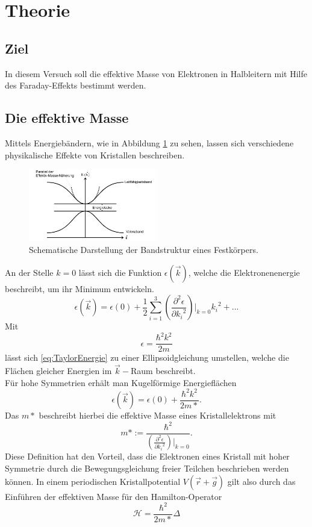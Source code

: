 \section{Theorie}
\label{sec:Theorie}
\subsection{Ziel}
 In diesem Versuch soll die effektive Masse von Elektronen in Halbleitern mit Hilfe des Faraday-Effekts bestimmt werden.
\subsection{Die effektive Masse}
 Mittels Energiebändern, wie in Abbildung \ref{fig:Energiebänder} zu sehen, lassen sich verschiedene physikalische Effekte
 von Kristallen beschreiben.
 \begin{figure}[H]
 \center
 \includegraphics[width=0.5\textwidth]{pics/Energiebaender.jpg}
 \caption{Schematische Darstellung der Bandstruktur eines Festkörpers.\cite{1}}  %
 \label{fig:Energiebänder}
 \end{figure}
 An der Stelle $k=0$ lässt sich die Funktion $\epsilon(\vec{k})$, welche die Elektronenenergie beschreibt, um ihr Minimum entwickeln.
 \begin{equation}
   \epsilon(\vec{k})= \epsilon(0)+\frac{1}{2}\sum_{i=1}^3\left(\frac{\partial^2 \epsilon}{\partial{k_i}^2}\right)|_{k=0}{k_i}^2+...
   \label{eq:TaylorEnergie}
 \end{equation}
 Mit
 \begin{equation}
   \epsilon = \frac{\hbar^2 k^2}{2m}
   \label{eq:Epsilonausdruck}
 \end{equation}
 lässt sich \ref{eq:TaylorEnergie} zu einer Ellipsoidgleichung umstellen,
  welche die Flächen gleicher Energien im $\vec{k}-$Raum beschreibt.\\
  Für hohe Symmetrien erhält man Kugelförmige Energieflächen
  \begin{equation}
    \epsilon(\vec{k})= \epsilon(0)+\frac{\hbar^2 k^2}{2m*}.
   \label{eq:KugelEnergie}
  \end{equation}
 Das $m*$ beschreibt hierbei die effektive Masse eines Kristallelektrons mit
 \begin{equation}
   m*:=\frac{\hbar^2}{\left(\frac{\partial^2 \epsilon}{\partial{k_i}^2}\right)|_{k=0}} .
 \end{equation}
 Diese Definition hat den Vorteil, dass die Elektronen eines Kristall mit hoher Symmetrie durch die Bewegungsgleichung
 freier Teilchen beschrieben werden können. In einem periodischen Kristallpotential $V(\vec{r}+\vec{g})$ gilt
  also durch das Einführen der effektiven Masse für den Hamilton-Operator
 \begin{equation}
   \mathcal{H}=\frac{\hbar^2}{2m*}\Delta
   \label{eq:freiHamilton}
 \end{equation}
